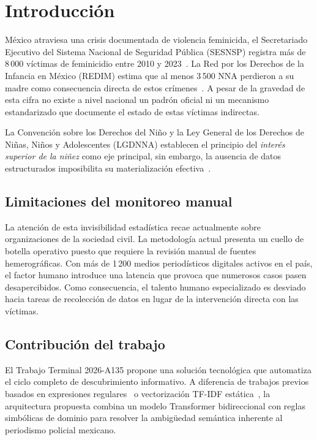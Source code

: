 \documentclass[conference]{IEEEtran}
\newcommand{\NNA}{NNA}
\begin{document}
\section{Introducción}

México atraviesa una crisis documentada de violencia feminicida, el
Secretariado Ejecutivo del Sistema Nacional de Seguridad Pública (SESNSP)
registra más de 8\,000 víctimas de feminicidio entre 2010 y
2023~\cite{sesnsp2023}. La Red por los Derechos de la Infancia en México
(REDIM) estima que al menos 3\,500 \NNA{} perdieron a su madre como
consecuencia directa de estos crímenes~\cite{redim2022}. A pesar de la
gravedad de esta cifra no existe a nivel nacional un padrón oficial ni un
mecanismo estandarizado que documente el estado de estas víctimas indirectas.

La Convención sobre los Derechos del Niño y la Ley General de los Derechos
de Niñas, Niños y Adolescentes (LGDNNA) establecen el principio del
\textit{interés superior de la niñez} como eje principal, sin embargo, la
ausencia de datos estructurados imposibilita su materialización
efectiva~\cite{onu2019}.

\subsection{Limitaciones del monitoreo manual}

La atención de esta invisibilidad estadística recae actualmente sobre
organizaciones de la sociedad civil. La metodología actual presenta un
cuello de botella operativo puesto que requiere la revisión manual de
fuentes hemerográficas. Con más de 1\,200 medios periodísticos digitales
activos en el país, el factor humano introduce una latencia que provoca
que numerosos casos pasen desapercibidos. Como consecuencia, el talento
humano especializado es desviado hacia tareas de recolección de datos
en lugar de la intervención directa con las víctimas.

\subsection{Contribución del trabajo}

El Trabajo Terminal 2026-A135 propone una solución tecnológica que automatiza
el ciclo completo de descubrimiento informativo. A diferencia de trabajos
previos basados en expresiones regulares~\cite{bird2009nlp} o vectorización
TF-IDF estática~\cite{joachims1998text}, la arquitectura propuesta combina
un modelo Transformer bidireccional con reglas simbólicas de dominio para
resolver la ambigüedad semántica inherente al periodismo policial mexicano.
\end{document}
